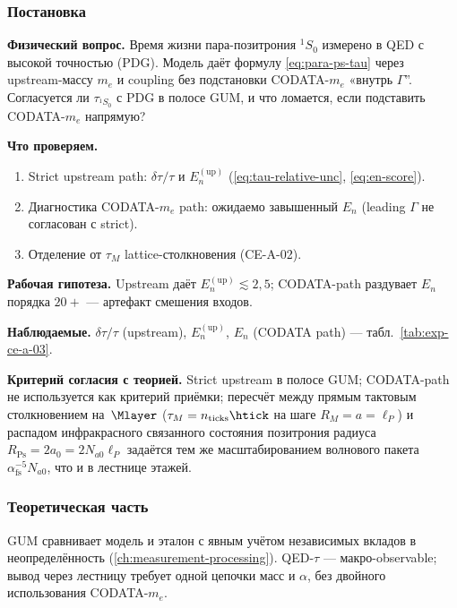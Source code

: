 \label{exp:cea03}

\subsubsection*{Постановка}
\textbf{Физический вопрос.}
Время жизни пара-позитрония $^1S_0$ измерено в QED с высокой точностью (PDG).
Модель даёт формулу \eqref{eq:para-ps-tau} через upstream-массу $m_e$ и coupling без подстановки CODATA-$m_e$ «внутрь $\Gamma$''.
Согласуется ли $\tau_{^1S_0}$ с PDG в полосе GUM, и что ломается, если подставить CODATA-$m_e$ напрямую?

\textbf{Что проверяем.}
\begin{enumerate}[label=\textbf{(\alph*)},leftmargin=*,itemsep=0.25em]
\item Strict upstream path: $\delta\tau/\tau$ и $E_n^{(\mathrm{up})}$ (\eqref{eq:tau-relative-unc}, \eqref{eq:en-score}).
\item Диагностика CODATA-$m_e$ path: ожидаемо завышенный $E_n$ (leading $\Gamma$ не согласован с strict).
\item Отделение от $\tau_M$ lattice-столкновения (CE-A-02).
\end{enumerate}

\textbf{Рабочая гипотеза.}
Upstream даёт $E_n^{(\mathrm{up})}\lesssim 2{,}5$; CODATA-path раздувает $E_n$ порядка $20+$ --- артефакт смешения входов.

\textbf{Наблюдаемые.}
$\delta\tau/\tau$ (upstream), $E_n^{(\mathrm{up})}$, $E_n$ (CODATA path) --- табл.~\ref{tab:exp-ce-a-03}.

\textbf{Критерий согласия с теорией.}
Strict upstream в полосе GUM; CODATA-path не используется как критерий приёмки; пересчёт между прямым тактовым столкновением на~$\Mlayer$ ($\tau_M = n_{\mathrm{ticks}}\htick$ на шаге $R_M = a = \ell_P$) и распадом инфракрасного связанного состояния позитрония радиуса $R_{\mathrm{Ps}} = 2a_0 = 2N_{a0}\ell_P$ задаётся тем же масштабированием волнового пакета $\alpha_{\mathrm{fs}}^{-5} N_{a0}$, что и в лестнице этажей.

\subsubsection*{Теоретическая часть}
GUM сравнивает модель и эталон с явным учётом независимых вкладов в неопределённость (\cref{ch:measurement-processing}).
QED-$\tau$ --- макро-observable; вывод через лестницу требует одной цепочки масс и $\alpha$, без двойного использования CODATA-$m_e$.

